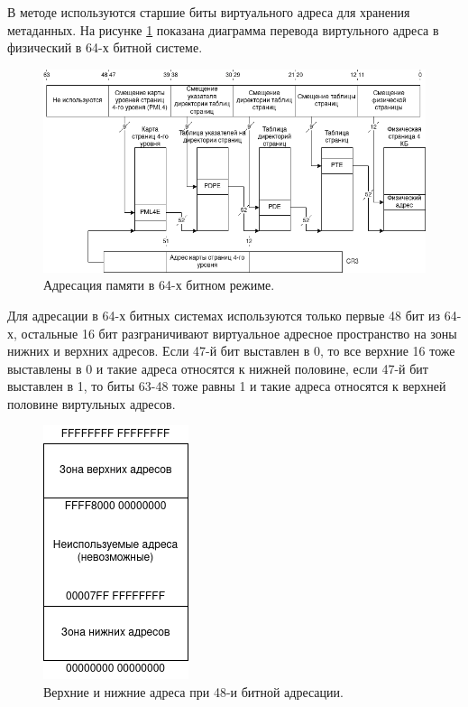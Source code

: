 В методе используются старшие биты виртуального адреса для хранения метаданных. На рисунке \ref{64bit-memory-addressing} показана диаграмма перевода виртульного адреса в физический в 64-х битной системе.

\begin{figure}[!h]
	\begin{center}
		\includegraphics[scale=0.6]{images/64bit-memory-addressing.png}
		\caption{Адресация памяти в 64-х битном режиме.}
		\label{64bit-memory-addressing}
	\end{center}
\end{figure}

Для адресации в 64-х битных системах используются только первые 48 бит из 64-х, остальные 16 бит разграничивают виртуальное адресное пространство на зоны нижних и верхних адресов. Если 47-й бит выставлен в 0, то все верхние 16 тоже выставлены в 0 и такие адреса относятся к нижней половине, если 47-й бит выставлен в 1, то биты 63-48 тоже равны 1 и такие адреса относятся к верхней половине виртульных адресов.\cite{paging}

\begin{figure}[!h]
	\begin{center}
		\includegraphics[scale=0.6]{images/48bit-half-spaces.png}
		\caption{Верхние и нижние адреса при 48-и битной адресации.}
		\label{48bit-half-spaces}
	\end{center}
\end{figure}

